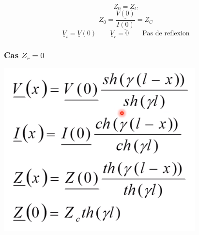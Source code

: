 \documentclass[12pt,a4paper]{report}
\begin{document}
\[
	Z_0 = Z_C
\]
\[
	Z_0 =  \dfrac{\underline{V(0)}}{\underline{I(0)}} = Z_C
\]
\[
	\underline{V}_i = \underline{V}(0) \qquad \underline{V}_r = 0 \qquad \text{Pas de reflexion}
\]

\subsubsection{Cas \(Z_r = 0\)}
\begin{center}

\includegraphics[scale=0.5]{equa.png}

\end{center}
\end{document}
